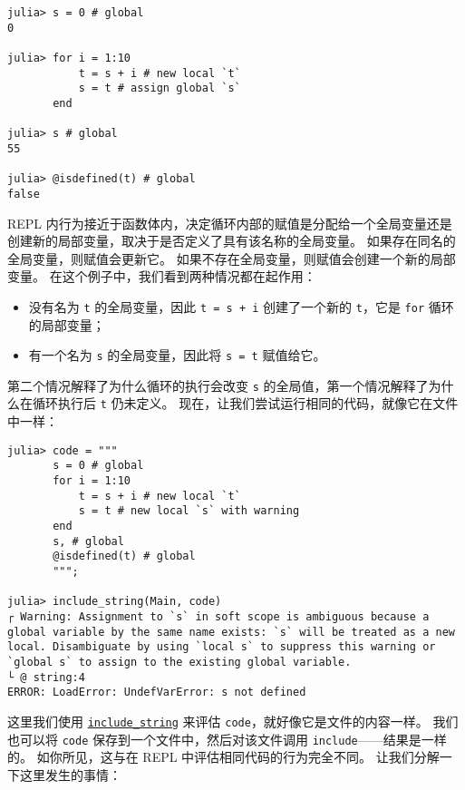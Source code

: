 \begin{verbatim}
julia> s = 0 # global
0

julia> for i = 1:10
           t = s + i # new local `t`
           s = t # assign global `s`
       end

julia> s # global
55

julia> @isdefined(t) # global
false
\end{verbatim}



REPL 内行为接近于函数体内，决定循环内部的赋值是分配给一个全局变量还是创建新的局部变量，取决于是否定义了具有该名称的全局变量。 如果存在同名的全局变量，则赋值会更新它。 如果不存在全局变量，则赋值会创建一个新的局部变量。 在这个例子中，我们看到两种情况都在起作用：



\begin{itemize}
\item 没有名为 \texttt{t} 的全局变量，因此 \texttt{t = s + i} 创建了一个新的 \texttt{t}，它是 \texttt{for} 循环的局部变量；


\item 有一个名为 \texttt{s} 的全局变量，因此将 \texttt{s = t} 赋值给它。

\end{itemize}


第二个情况解释了为什么循环的执行会改变 \texttt{s} 的全局值，第一个情况解释了为什么在循环执行后 \texttt{t} 仍未定义。 现在，让我们尝试运行相同的代码，就像它在文件中一样：




\begin{verbatim}
julia> code = """
       s = 0 # global
       for i = 1:10
           t = s + i # new local `t`
           s = t # new local `s` with warning
       end
       s, # global
       @isdefined(t) # global
       """;

julia> include_string(Main, code)
┌ Warning: Assignment to `s` in soft scope is ambiguous because a global variable by the same name exists: `s` will be treated as a new local. Disambiguate by using `local s` to suppress this warning or `global s` to assign to the existing global variable.
└ @ string:4
ERROR: LoadError: UndefVarError: s not defined
\end{verbatim}



这里我们使用 \hyperlink{2796348696499086186}{\texttt{include\_string}} 来评估 \texttt{code}，就好像它是文件的内容一样。 我们也可以将 \texttt{code} 保存到一个文件中，然后对该文件调用 \texttt{include}——结果是一样的。 如你所见，这与在 REPL 中评估相同代码的行为完全不同。 让我们分解一下这里发生的事情：



